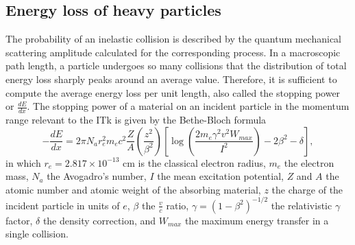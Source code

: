 \subsection{Energy loss of heavy particles}\label{subsect:e-loss-heavy}

The probability of an inelastic collision is described by the quantum mechanical scattering amplitude calculated for the corresponding process. 
In a macroscopic path length, a particle undergoes so many collisions that the distribution of total energy loss sharply peaks around an average value. 
Therefore, it is sufficient to compute the average energy loss per unit length, also called the stopping power or $\frac{dE}{dx}$. 
The stopping power of a material on an incident particle in the momentum range relevant to the ITk is given by the Bethe-Bloch formula \cite{Zyla:2020zbs}
\begin{equation}
    \label{eq:6.1}
    -\frac{dE}{dx} = 2\pi N_a r_e^2 m_e c^2 \frac{Z}{A} \left( \frac{z^2}{\beta^2}\right) \left[ \log \left( \frac{2m_e \gamma^2 v^2 W_{max}}{I^2}\right) - 2\beta^2 -\delta   \right],
\end{equation}
in which $r_e = 2.817\times 10^{-13}$ cm is the classical electron radius, $m_e$ the electron mass, $N_a$ the Avogadro's number, $I$ the mean excitation potential, $Z$ and $A$ the atomic number and atomic weight of the absorbing material, $z$ the charge of the incident particle in units of $e$, $\beta $ the $\frac{v}{c}$ ratio, $\gamma = (1-\beta^2)^{-1/2}$ the relativistic $\gamma$ factor, $\delta$ the density correction, and $W_{max}$ the maximum energy transfer in a single collision.


